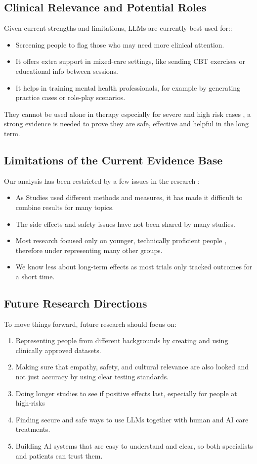 \documentclass[sn-basic,authoryear]{sn-jnl}
\begin{document}
\subsection{Clinical Relevance and Potential Roles}
Given current strengths and limitations, LLMs are currently best used for::
\begin{itemize}
\item Screening people to flag those who may need more clinical attention.
\item It offers extra support in mixed-care settings, like sending CBT exercises or educational info between sessions.
\item It helps in training mental health professionals, for example by generating practice cases or role-play scenarios.
\end{itemize}
They cannot be used alone in therapy especially for severe and high risk cases , a strong evidence is needed to prove they are safe, effective and helpful in the long term.

\subsection{Limitations of the Current Evidence Base}
Our analysis has been restricted by a few issues in the research :
\begin{itemize}
\item As Studies used different methods and measures, it has made it difficult to combine results for many topics.
\item The side effects and safety issues have not been shared by many studies.
\item Most research focused only on younger, technically proficient people , therefore under representing many other groups.
\item We know less about long-term effects as most trials only tracked outcomes for a short time.
\end{itemize}

\subsection{Future Research Directions}
To move things forward, future research should focus on:
\begin{enumerate}
\item Representing people from different backgrounds by creating and using clinically approved datasets. 
\item Making sure that empathy, safety, and cultural relevance are also looked and not just accuracy by using clear testing standards.
\item Doing longer studies to see if positive effects last, especially for people at high-risks
\item Finding secure and safe ways to use LLMs together with human and AI care treatments.
\item Building AI systems that are easy to understand and clear, so both specialists and patients can trust them.
\end{enumerate}
\end{document}
